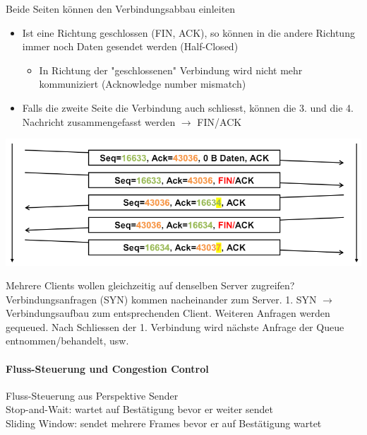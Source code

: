\begin{example}
    Beide Seiten können den Verbindungsabbau einleiten
    \begin{itemize}
        \item Ist eine Richtung geschlossen (FIN, ACK), so können in die andere Richtung immer noch Daten gesendet werden (Half-Closed)
        \begin{itemize}
            \item In Richtung der "geschlossenen" Verbindung wird nicht mehr kommuniziert (Acknowledge number mismatch)
        \end{itemize}
        \item Falls die zweite Seite die Verbindung auch schliesst, können die 3. und die 4. Nachricht zusammengefasst werden $\rightarrow$ FIN/ACK
    \end{itemize}
    \centering
        \includegraphics[width=0.8\linewidth]{images/tcp_verbindungsabbau_ex.png}
\end{example}


\begin{remark}
    Mehrere Clients wollen gleichzeitig auf denselben Server zugreifen?\\
    Verbindungsanfragen (SYN) kommen nacheinander zum Server. 1. SYN $\rightarrow$ Verbindungsaufbau zum entsprechenden Client. 
    Weiteren Anfragen werden gequeued. Nach Schliessen der 1. Verbindung wird nächste Anfrage der Queue entnommen/behandelt, usw.
\end{remark}




\paragraph*{Fluss-Steuerung und Congestion Control}



\begin{concept}{Fluss-Steuerung} aus Perspektive Sender\\
    Stop-and-Wait: wartet auf Bestätigung bevor er weiter sendet\\
    Sliding Window: sendet mehrere Frames bevor er auf Bestätigung wartet
\end{concept}

